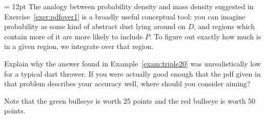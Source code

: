 \documentclass[indent]{watsonbook}
\begin{document}
\begin{minipage}[t]{0.55\textwidth} \parskip = 12pt
  The analogy between probability density and mass density suggested
  in Exercise~\ref{exer:pdfover1} is a broadly useful conceptual tool:
  you can imagine probability as some kind of abstract dust lying around
  on $D$, and regions which contain more of it are more likely to
  include $P$. To figure out exactly how much is in a given region, we
  integrate over that region.

  \begin{exercise}{}{}
    Explain why the answer found in Example~\ref{exam:triple20} was
    unrealistically low for a typical dart thrower. If you were
    actually good enough that the pdf given in that problem describes
    your accuracy well, where should you consider aiming?

    Note that the green bullseye is worth 25 points and the red
    bullseye is worth 50 points.
  \end{exercise}
\end{minipage} \hfill
\end{document}
